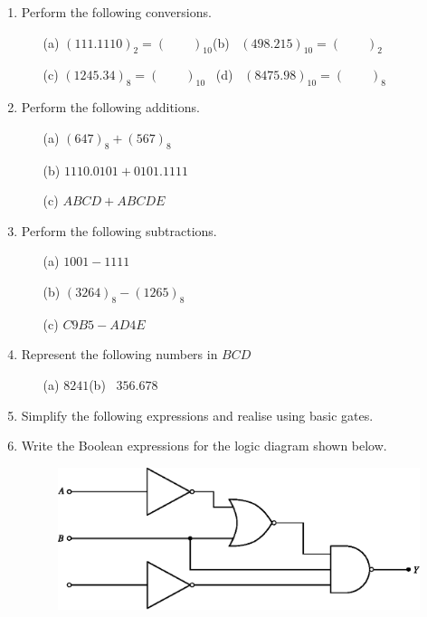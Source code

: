 \begin{enumerate}
\renewcommand{\labelenumi}{\bf\theenumi.}
\item Perform the following conversions.
\begin{itemize}
\item[(a)] $(111.1110)_{2}=(\qquad)_{10}$\qquad (b)~ $(498.215)_{10}=(\qquad)_{2}$

\item[(c)] $(1245.34)_{8}=(\qquad)_{10}$\qquad~ (d)~ $(8475.98)_{10}=(\qquad)_{8}$

\end{itemize}

\item Perform the following additions.
\begin{itemize}
\item[(a)] $(647)_{8}+(567)_{8}$

\item[(b)] $1110.0101+0101.1111$

\item[(c)] $ABCD+ABCDE$
\end{itemize}



\item Perform the following subtractions.
\begin{itemize}
\item[(a)] $1001-1111$

\item[(b)] $(3264)_{8}-(1265)_{8}$

\item[(c)] $C9B5-AD4E$
\end{itemize}

\vfill\eject

\item Represent the following numbers in $BCD$
\begin{itemize}
\item[(a)] $8241$\qquad\qquad (b)~ $356.678$
\end{itemize}

\item Simplify the following expressions and realise using basic gates.

\item Write the Boolean expressions for the logic diagram shown below.
\begin{figure}[H]
\centering
\includegraphics{chap6/exr6.6.eps}
\end{figure}
\end{enumerate}


